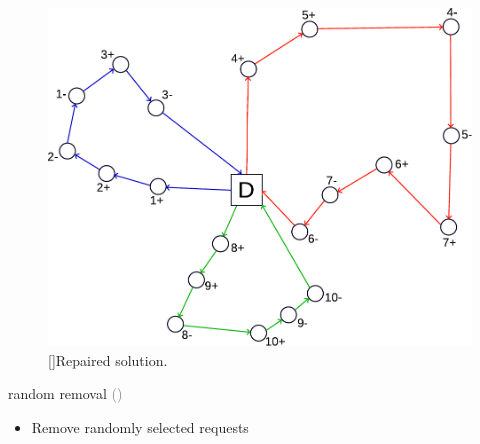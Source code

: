 \documentclass[aspectratio=1610]{beamer}
\let\oldfootnotesize\footnotesize
\renewcommand*{\footnotesize}{\oldfootnotesize\fontsize{6}{4}\selectfont}
\renewcommand{\footnotesize}{\scriptsize}
\begin{document}
\begin{frame}
\begin{minipage}[t]{.3\textwidth}
\begin{figure}
	\centering
	\includegraphics[width=\textwidth]{graphics/lns-repair-solution-new} 
	[]{Repaired solution.}
\end{figure}
\end{minipage}%

\bigskip


 random removal {\footnotesize{\textcolor{gray}{(\cite{Ropke:2006})}}}
\begin{itemize}
	\item Remove randomly selected requests 
\end{itemize}


\end{frame}
\end{document}
